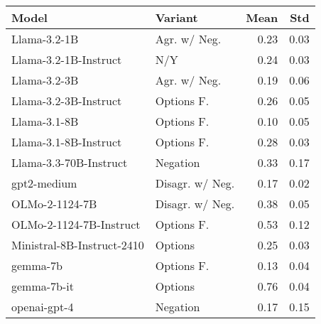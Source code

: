 \begin{tabular}{llrr}
\toprule
Model & Variant & Mean & Std \\
\midrule
Llama-3.2-1B & Agr. w/ Neg. & 0.23 & 0.03 \\
Llama-3.2-1B-Instruct & N/Y & 0.24 & 0.03 \\
Llama-3.2-3B & Agr. w/ Neg. & 0.19 & 0.06 \\
Llama-3.2-3B-Instruct & Options F. & 0.26 & 0.05 \\
Llama-3.1-8B & Options F. & 0.10 & 0.05 \\
Llama-3.1-8B-Instruct & Options F. & 0.28 & 0.03 \\
Llama-3.3-70B-Instruct & Negation & 0.33 & 0.17 \\
gpt2-medium & Disagr. w/ Neg. & 0.17 & 0.02 \\
OLMo-2-1124-7B & Disagr. w/ Neg. & 0.38 & 0.05 \\
OLMo-2-1124-7B-Instruct & Options F. & 0.53 & 0.12 \\
Ministral-8B-Instruct-2410 & Options & 0.25 & 0.03 \\
gemma-7b & Options F. & 0.13 & 0.04 \\
gemma-7b-it & Options & 0.76 & 0.04 \\
openai-gpt-4 & Negation & 0.17 & 0.15 \\
\bottomrule
\end{tabular}
